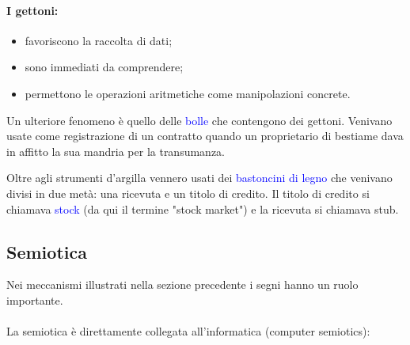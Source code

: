 \paragraph{I gettoni:}

\begin{itemize}
    \item favoriscono la raccolta di dati;
    \item sono immediati da comprendere;
    \item permettono le operazioni aritmetiche come manipolazioni concrete.
\end{itemize}

Un ulteriore fenomeno è quello delle \textcolor{blue}{bolle} che contengono dei gettoni. Venivano usate come registrazione di un contratto quando un proprietario di bestiame dava in affitto la sua mandria per la transumanza.

Oltre agli strumenti d'argilla vennero usati dei \textcolor{blue}{bastoncini di legno} che venivano divisi in due metà: una ricevuta e un titolo di credito. Il titolo di credito si chiamava \textcolor{blue}{stock} (da qui il termine "stock market") e la ricevuta si chiamava stub.

\subsection{Semiotica}

Nei meccanismi illustrati nella sezione precedente i segni hanno un ruolo importante. 


\paragraph{}

La semiotica è direttamente collegata all'informatica (computer semiotics):

